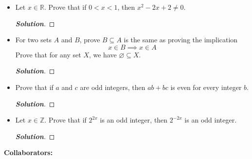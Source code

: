 \documentclass[11pt]{article}
\newenvironment{problem}[2][Problem\!]{\begin{trivlist}
\item[\hskip \labelsep {\bfseries #1}\hskip \labelsep {\bfseries #2.}]}{\end{trivlist}}
\newenvironment{solution}{\begin{proof}[\textbf{\textit{Solution}}]}{\end{proof}}
\newcommand{\zz}{\mathbb Z}   %
\newcommand{\rr}{\mathbb R}   %
\renewcommand{\emptyset}{\varnothing}
\begin{document}
\begin{problem}{3.2}\hfill
\begin{itemize}[itemsep=3em]
\item[(a)] Let $x \in \rr$. Prove that if $0 < x < 1$, then $x^2 - 2x + 2 \neq 0$.
\begin{solution}
\end{solution}

\item[(b)] For two sets $A$ and $B$, prove $B \subseteq A$ is the same as proving the implication 
\[x \in B \implies x \in A\]
Prove that for any set $X$, we have $\emptyset \subseteq X$.
\begin{solution}
\end{solution}

\end{itemize}
\end{problem}

\newpage  %

\begin{problem}{3.3}\hfill
\begin{itemize}[itemsep=3em]
\item[(a)] Prove that if $a$ and $c$ are odd integers, then $ab + bc$ is even for every integer $b$.
\begin{solution}
\end{solution}

\item[(b)] Let $x \in \zz$. Prove that if $2^{2x}$ is an odd integer, then $2^{-2x}$ is an odd integer.
\begin{solution}
\end{solution}

\end{itemize}
\end{problem}

\newpage  %

\begin{center}
\textbf{Collaborators:}
\end{center}
\vfill 
\end{document}
